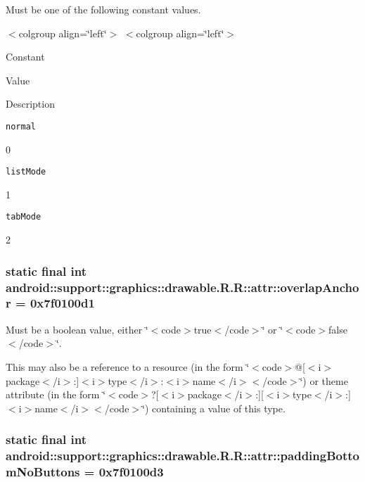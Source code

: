 Must be one of the following constant values. \begin{TabularC}{0}
\hline
\end{TabularC}
$<$colgroup align=\char`\"{}left\char`\"{}$>$ $<$colgroup align=\char`\"{}left\char`\"{}$>$ 

Constant

Value

Description 

{\tt normal}

0

{\tt listMode}

1

{\tt tabMode}

2\hypertarget{classandroid_1_1support_1_1graphics_1_1drawable_1_1_r_1_1attr_8d1cadd5be52c9dae1ba54b63e0e108a}{
\subsubsection[{overlapAnchor}]{\setlength{\rightskip}{0pt plus 5cm}static final int android::support::graphics::drawable.R.R::attr::overlapAnchor = 0x7f0100d1}}
\label{classandroid_1_1support_1_1graphics_1_1drawable_1_1_r_1_1attr_8d1cadd5be52c9dae1ba54b63e0e108a}


Must be a boolean value, either \char`\"{}$<$code$>$true$<$/code$>$\char`\"{} or \char`\"{}$<$code$>$false$<$/code$>$\char`\"{}. 

This may also be a reference to a resource (in the form \char`\"{}$<$code$>$@\mbox{[}$<$i$>$package$<$/i$>$:\mbox{]}$<$i$>$type$<$/i$>$:$<$i$>$name$<$/i$>$$<$/code$>$\char`\"{}) or theme attribute (in the form \char`\"{}$<$code$>$?\mbox{[}$<$i$>$package$<$/i$>$:\mbox{]}\mbox{[}$<$i$>$type$<$/i$>$:\mbox{]}$<$i$>$name$<$/i$>$$<$/code$>$\char`\"{}) containing a value of this type. \hypertarget{classandroid_1_1support_1_1graphics_1_1drawable_1_1_r_1_1attr_267837666e1c22b9c7a367cb53834d3b}{
\subsubsection[{paddingBottomNoButtons}]{\setlength{\rightskip}{0pt plus 5cm}static final int android::support::graphics::drawable.R.R::attr::paddingBottomNoButtons = 0x7f0100d3}}
\label{classandroid_1_1support_1_1graphics_1_1drawable_1_1_r_1_1attr_267837666e1c22b9c7a367cb53834d3b}


